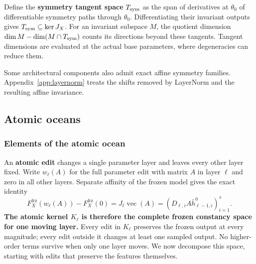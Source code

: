 \documentclass[twoside]{article}
\theoremstyle{remark}
\newcommand{\frz}{\mathrm{frz}}
\theoremstyle{highlightdefinition}
\theoremstyle{remark}
\begin{document}
Define the \textbf{symmetry tangent space} $T_{\rm sym}$ as the span of derivatives at $\theta_0$ of differentiable symmetry paths through $\theta_0$. Differentiating their invariant outputs gives $T_{\rm sym}\subseteq\ker J_X$. For an invariant subspace $M$, the quotient dimension $\dim M-\dim(M\cap T_{\rm sym})$ counts its directions beyond these tangents. Tangent dimensions are evaluated at the actual base parameters, where degeneracies can reduce them.

Some architectural components also admit exact affine symmetry families. Appendix~\ref{app:layernorm} treats the shifts removed by LayerNorm and the resulting affine invariance.

\subsection{Atomic oceans}
\label{app:atomic-proof}
\subsubsection{Elements of the atomic ocean}
An \textbf{atomic edit} changes a single parameter layer and leaves every other layer fixed. Write $w_\ell(A)$ for the full parameter edit with matrix $A$ in layer $\ell$ and zero in all other layers. Separate affinity of the frozen model gives the exact identity
\[
 F_X^{\frz}(w_\ell(A))-F_X^{\frz}(0)
 =J_\ell\operatorname{vec}(A)
 =(D_{\ell,i}A\bar h_{\ell-1,i}^0)_{i=1}^s.
\]
\textbf{The atomic kernel $K_\ell$ is therefore the complete frozen constancy space for one moving layer.} Every edit in $K_\ell$ preserves the frozen output at every magnitude; every edit outside it changes at least one sampled output. No higher-order terms survive when only one layer moves. We now decompose this space, starting with edits that preserve the features themselves.
\end{document}
